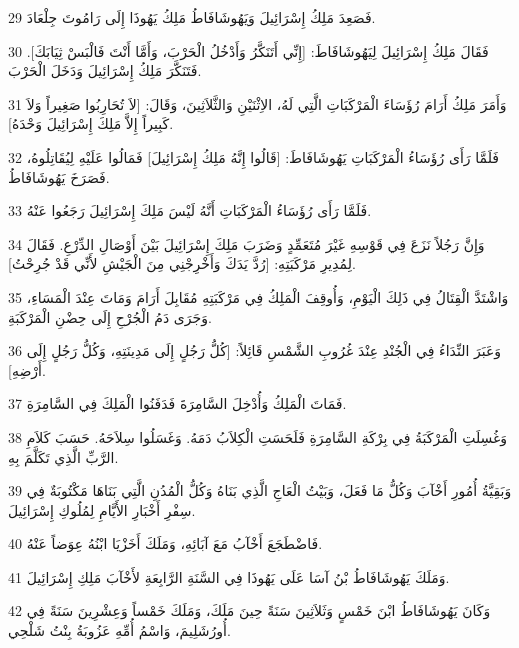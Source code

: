\par 29 فَصَعِدَ مَلِكُ إِسْرَائِيلَ وَيَهُوشَافَاطُ مَلِكُ يَهُوذَا إِلَى رَامُوتَ جِلْعَادَ.
\par 30 فَقَالَ مَلِكُ إِسْرَائِيلَ لِيَهُوشَافَاطَ: [إِنِّي أَتَنَكَّرُ وَأَدْخُلُ الْحَرْبَ، وَأَمَّا أَنْتَ فَالْبَسْ ثِيَابَكَ]. فَتَنَكَّرَ مَلِكُ إِسْرَائِيلَ وَدَخَلَ الْحَرْبَ.
\par 31 وَأَمَرَ مَلِكُ أَرَامَ رُؤَسَاءَ الْمَرْكَبَاتِ الَّتِي لَهُ، الاِثْنَيْنِ وَالثَّلاَثِينَ، وَقَالَ: [لاَ تُحَارِبُوا صَغِيراً وَلاَ كَبِيراً إِلاَّ مَلِكَ إِسْرَائِيلَ وَحْدَهُ].
\par 32 فَلَمَّا رَأَى رُؤَسَاءُ الْمَرْكَبَاتِ يَهُوشَافَاطَ: [قَالُوا إِنَّهُ مَلِكُ إِسْرَائِيلَ] فَمَالُوا عَلَيْهِ لِيُقَاتِلُوهُ، فَصَرَخَ يَهُوشَافَاطُ.
\par 33 فَلَمَّا رَأَى رُؤَسَاءُ الْمَرْكَبَاتِ أَنَّهُ لَيْسَ مَلِكَ إِسْرَائِيلَ رَجَعُوا عَنْهُ.
\par 34 وَإِنَّ رَجُلاً نَزَعَ فِي قَوْسِهِ غَيْرَ مُتَعَمِّدٍ وَضَرَبَ مَلِكَ إِسْرَائِيلَ بَيْنَ أَوْصَالِ الدِّرْعِ. فَقَالَ لِمُدِيرِ مَرْكَبَتِهِ: [رُدَّ يَدَكَ وَأَخْرِجْنِي مِنَ الْجَيْشِ لأَنِّي قَدْ جُرِحْتُ].
\par 35 وَاشْتَدَّ الْقِتَالُ فِي ذَلِكَ الْيَوْمِ، وَأُوقِفَ الْمَلِكُ فِي مَرْكَبَتِهِ مُقَابِلَ أَرَامَ وَمَاتَ عِنْدَ الْمَسَاءِ، وَجَرَى دَمُ الْجُرْحِ إِلَى حِضْنِ الْمَرْكَبَةِ.
\par 36 وَعَبَرَ النِّدَاءُ فِي الْجُنْدِ عِنْدَ غُرُوبِ الشَّمْسِ قَائِلاً: [كُلُّ رَجُلٍ إِلَى مَدِينَتِهِ، وَكُلُّ رَجُلٍ إِلَى أَرْضِهِ].
\par 37 فَمَاتَ الْمَلِكُ وَأُدْخِلَ السَّامِرَةَ فَدَفَنُوا الْمَلِكَ فِي السَّامِرَةِ.
\par 38 وَغُسِلَتِ الْمَرْكَبَةُ فِي بِرْكَةِ السَّامِرَةِ فَلَحَسَتِ الْكِلاَبُ دَمَهُ. وَغَسَلُوا سِلاَحَهُ. حَسَبَ كَلاَمِ الرَّبِّ الَّذِي تَكَلَّمَ بِهِ.
\par 39 وَبَقِيَّةُ أُمُورِ أَخْآبَ وَكُلُّ مَا فَعَلَ، وَبَيْتُ الْعَاجِ الَّذِي بَنَاهُ وَكُلُّ الْمُدُنِ الَّتِي بَنَاهَا مَكْتُوبَةٌ فِي سِفْرِ أَخْبَارِ الأَيَّامِ لِمُلُوكِ إِسْرَائِيلَ.
\par 40 فَاضْطَجَعَ أَخْآبُ مَعَ آبَائِهِ، وَمَلَكَ أَخَزْيَا ابْنُهُ عِوَضاً عَنْهُ.
\par 41 وَمَلَكَ يَهُوشَافَاطُ بْنُ آسَا عَلَى يَهُوذَا فِي السَّنَةِ الرَّابِعَةِ لأَخْآبَ مَلِكِ إِسْرَائِيلَ.
\par 42 وَكَانَ يَهُوشَافَاطُ ابْنَ خَمْسٍ وَثَلاَثِينَ سَنَةً حِينَ مَلَكَ، وَمَلَكَ خَمْساً وَعِشْرِينَ سَنَةً فِي أُورُشَلِيمَ، وَاسْمُ أُمِّهِ عَزُوبَةُ بِنْتُ شَلْحِي.
